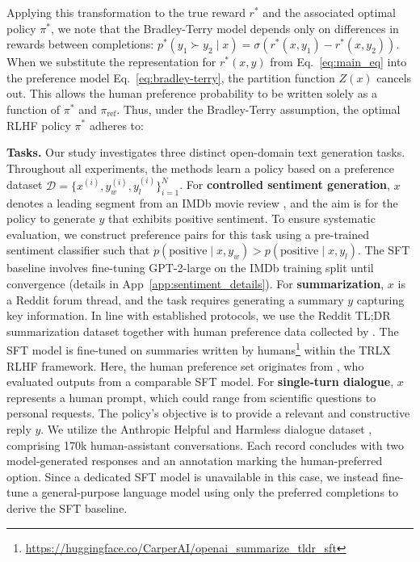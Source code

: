 Applying this transformation to the true reward $r^*$ and the associated optimal policy $\pi^*$, we note that the Bradley-Terry model depends only on differences in rewards between completions: ${p^*(y_1 \succ y_2 \mid x) = \sigma(r^*(x, y_1) - r^*(x, y_2))}$. When we substitute the representation for $r^*(x,y)$ from Eq.~\ref{eq:main_eq} into the preference model Eq.~\ref{eq:bradley-terry}, the partition function $Z(x)$ cancels out. This allows the human preference probability to be written solely as a function of $\pi^*$ and $\pi_\text{ref}$. Thus, under the Bradley-Terry assumption, the optimal RLHF policy $\pi^*$ adheres to:

\textbf{Tasks.} Our study investigates three distinct open-domain text generation tasks. Throughout all experiments, the methods learn a policy based on a preference dataset $\mathcal{D}=\bigl\{x^{(i)}, y_w^{(i)}, y_l^{(i)}\bigr\}_{i=1}^N$. For \textbf{controlled sentiment generation}, $x$ denotes a leading segment from an IMDb movie review \cite{maas-EtAl:2011:ACL-HLT2011}, and the aim is for the policy to generate $y$ that exhibits positive sentiment. To ensure systematic evaluation, we construct preference pairs for this task using a pre-trained sentiment classifier such that $p(\text{positive}\mid x,y_w)>p(\text{positive}\mid x,y_l)$. The SFT baseline involves fine-tuning GPT-2-large on the IMDb training split until convergence (details in App~\ref{app:sentiment_details}). For \textbf{summarization}, $x$ is a Reddit forum thread, and the task requires generating a summary $y$ capturing key information. In line with established protocols, we use the Reddit TL;DR summarization dataset \citep{volske-etal-2017-tl} together with human preference data collected by \citeauthor{stiennon2022learning}. The SFT model is fine-tuned on summaries written by humans\footnote{\url{https://huggingface.co/CarperAI/openai_summarize_tldr_sft}} within the TRLX \citep{leandro_von_werra_2023_7790115} RLHF framework. Here, the human preference set originates from \citeauthor{stiennon2022learning}, who evaluated outputs from a comparable SFT model. For \textbf{single-turn dialogue}, $x$ represents a human prompt, which could range from scientific questions to personal requests. The policy’s objective is to provide a relevant and constructive reply $y$. We utilize the Anthropic Helpful and Harmless dialogue dataset \citep{bai2022training}, comprising 170k human-assistant conversations. Each record concludes with two model-generated responses and an annotation marking the human-preferred option. Since a dedicated SFT model is unavailable in this case, we instead fine-tune a general-purpose language model using only the preferred completions to derive the SFT baseline.

